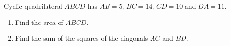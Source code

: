 Cyclic quadrilateral $ABCD$ has $AB=5$, $BC=14$, $CD=10$ and $DA=11$.
\begin{enumerate}
\item[(a)] Find the area of $ABCD$.
\item[(b)] Find the sum of the squares of the diagonals $AC$ and $BD$.
\end{enumerate}
